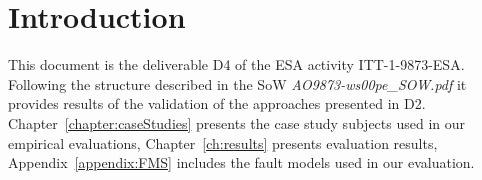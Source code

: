 
\chapter*{Introduction}
\label{sec:introduction}

This document is the deliverable D4 of the ESA activity ITT-1-9873-ESA. Following the structure described in the SoW \emph{AO9873-ws00pe\_SOW.pdf} it provides results of the validation of the approaches presented in D2.
Chapter~\ref{chapter:caseStudies} presents the case study subjects used in our empirical evaluations, Chapter~\ref{ch:results} presents evaluation results, Appendix~\ref{appendix:FMS} includes the fault models used in our evaluation.
 
